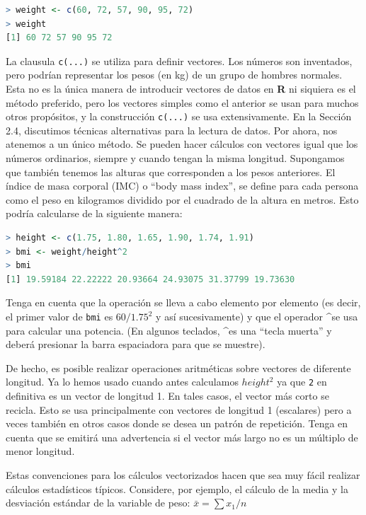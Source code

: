 \documentclass[spanish]{extbook}
\numberwithin{equation}{section}
\numberwithin{figure}{section}
\begin{document}
\begin{lstlisting}[language=R]
> weight <- c(60, 72, 57, 90, 95, 72) 
> weight 
[1] 60 72 57 90 95 72
\end{lstlisting}

La clausula \texttt{c(...)} se utiliza para definir vectores. Los números son
inventados, pero podrían representar los pesos (en kg) de un grupo de hombres
normales. Esta no es la única manera de introducir vectores de datos en
\textbf{R} ni siquiera es el método preferido, pero los vectores simples como
el anterior se usan para muchos otros propósitos, y la construcción
\texttt{c(...)} se usa extensivamente. En la Sección 2.4, discutimos técnicas
alternativas para la lectura de datos. Por ahora, nos atenemos a un único
método. Se pueden hacer cálculos con vectores igual que los números ordinarios,
siempre y cuando tengan la misma longitud.  Supongamos que también tenemos las
alturas que corresponden a los pesos anteriores. El índice de masa corporal
(IMC) o ``body mass index'', se define para cada persona como el peso en
kilogramos dividido por el cuadrado de la altura en metros. Esto podría
calcularse de la siguiente manera:

\begin{lstlisting}[language=R]
> height <- c(1.75, 1.80, 1.65, 1.90, 1.74, 1.91) 
> bmi <- weight/height^2 
> bmi 
[1] 19.59184 22.22222 20.93664 24.93075 31.37799 19.73630
\end{lstlisting}

Tenga en cuenta que la operación se lleva a cabo elemento por elemento (es
decir, el primer valor de \texttt{bmi} es $60/1.75^2$ y así sucesivamente) y
que el operador \textasciicircum se usa para calcular una potencia. (En algunos
teclados, \textasciicircum es una ``tecla muerta'' y deberá presionar la barra
espaciadora para que se muestre).

De hecho, es posible realizar operaciones aritméticas sobre vectores de
diferente longitud. Ya lo hemos usado cuando antes calculamos $height^2$
ya que \texttt{2} en definitiva es un vector de longitud 1. En tales casos, el
vector más corto se recicla. Esto se usa principalmente con vectores de
longitud 1 (escalares) pero a veces también en otros casos donde se desea un
patrón de repetición. Tenga en cuenta que se emitirá una advertencia si el
vector más largo no es un múltiplo de menor longitud.

Estas convenciones para los cálculos vectorizados hacen que sea muy fácil
realizar cálculos estadísticos típicos. Considere, por ejemplo, el cálculo
de la media y la desviación estándar de la variable de peso: $\bar{x} = \sum x_1/n$
\end{document}
